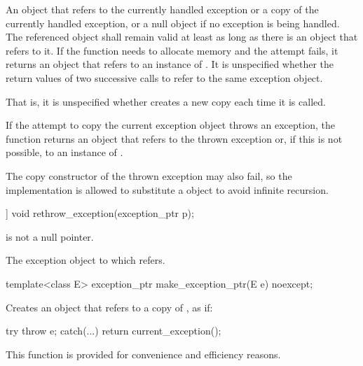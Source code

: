 \begin{itemdescr}
\pnum
\returns An  object that refers to
the currently handled exception or a copy of the currently
handled exception, or a null  object if no exception is being
handled. The referenced object shall remain valid at least as long as there is an
 object that refers to it.
If the function needs to allocate memory and the attempt fails, it returns an
 object that refers to an instance of .
It is unspecified whether the return values of two successive calls to
 refer to the same exception object.
\begin{note} That is, it is unspecified whether 
creates a new copy each time it is called. \end{note}
If the attempt to copy the current exception object throws an exception, the function
returns an  object that refers to the thrown exception or,
if this is not possible, to an instance of . \begin{note} The
copy constructor of the thrown exception may also fail, so the implementation is allowed
to substitute a  object to avoid infinite
recursion.\end{note}
\end{itemdescr}

%
\begin{itemdecl}
[[noreturn]] void rethrow_exception(exception_ptr p);
\end{itemdecl}

\begin{itemdescr}
\pnum
\expects {} is not a null pointer.

\pnum
\throws The exception object to which  refers.
\end{itemdescr}

%
\begin{itemdecl}
template<class E> exception_ptr make_exception_ptr(E e) noexcept;
\end{itemdecl}

\begin{itemdescr}
\pnum
\effects Creates an  object that refers to a copy of , as if:
\begin{codeblock}
try {
  throw e;
} catch(...) {
  return current_exception();
}
\end{codeblock}

\pnum
\begin{note} This function is provided for convenience and
efficiency reasons. \end{note}
\end{itemdescr}


